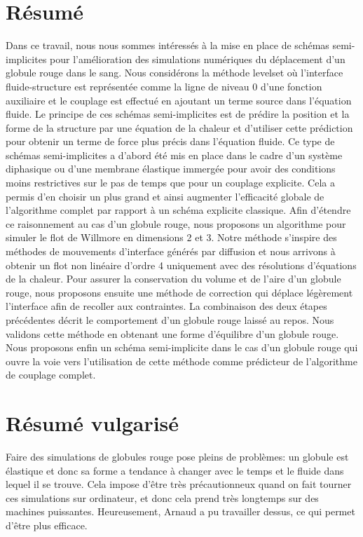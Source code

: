 \documentclass[a4paper]{leaflet}
\begin{document}
\section*{Résumé}
Dans ce travail, nous nous sommes intéressés à la mise en place de schémas semi- implicites pour l'amélioration des simulations numériques du déplacement d'un globule rouge dans le sang. Nous considérons la méthode levelset où l'interface fluide-structure est représentée comme la ligne de niveau 0 d'une fonction auxiliaire et le couplage est effectué en ajoutant un terme source dans l'équation fluide. Le principe de ces schémas semi-implicites est de prédire la position et la forme de la structure par une équation de la chaleur et d'utiliser cette prédiction pour obtenir un terme de force plus précis dans l'équation fluide. Ce type de schémas semi-implicites a d'abord été mis en place dans le cadre d'un système diphasique ou d'une membrane élastique immergée pour avoir des conditions moins restrictives sur le pas de temps que pour un couplage explicite. Cela a permis d'en choisir un plus grand et ainsi augmenter l'efficacité globale de l'algorithme complet par rapport à un schéma explicite classique. Afin d'étendre ce raisonnement au cas d'un globule rouge, nous proposons un algorithme pour simuler le flot de Willmore en dimensions 2 et 3. Notre méthode s'inspire des méthodes de mouvements d'interface générés par diffusion et nous arrivons à obtenir un flot non linéaire d'ordre 4 uniquement avec des résolutions d'équations de la chaleur. Pour assurer la conservation du volume et de l'aire d'un globule rouge, nous proposons ensuite une méthode de correction qui déplace légèrement l'interface afin de recoller aux contraintes. La combinaison des deux étapes précédentes décrit le comportement d'un globule rouge laissé au repos. Nous validons cette méthode en obtenant une forme d'équilibre d'un globule rouge. Nous proposons enfin un schéma semi-implicite dans le cas d'un globule rouge qui ouvre la voie vers l'utilisation de cette méthode comme prédicteur de l'algorithme de couplage complet.
\section*{Résumé vulgarisé}
Faire des simulations de globules rouge pose pleins de problèmes: un globule est élastique et donc sa forme a tendance à changer avec le temps et le fluide dans lequel il se trouve. Cela impose d'être très précautionneux quand on fait tourner ces simulations sur ordinateur, et donc cela prend très longtemps sur des machines puissantes. Heureusement, Arnaud a pu travailler dessus, ce qui permet d'être plus efficace.
\end{document}
